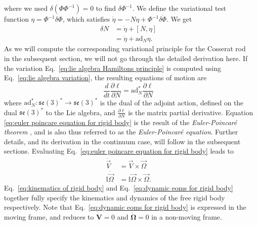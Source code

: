 where we used $\delta (\Phi \Phi^{-1}) = 0$ to find $\delta \Phi^{-1}$. We define the variational test function $\eta = \Phi^{-1} \delta \Phi$, which satisfies $\dot{\eta} = - N \eta + \Phi^{-1} \delta \dot{\Phi}$. We get
\begin{equation} \label{eq:lie algebra variation}
\begin{aligned}
\delta N & = \dot{\eta} + [N, \eta] \\
& = \dot{\eta} + \text{ad}_N \eta.
\end{aligned}
\end{equation}
As we will compute the corresponding variational principle for the Cosserat rod in the subsequent section, we will not go through the detailed derivation here. If the variation Eq.~\ref{eq:lie algebra Hamiltons principle} is computed using Eq.~\ref{eq:lie algebra variation}, the resulting equations of motion are
\begin{equation} \label{eq:euler poincare equation for rigid body}
\frac{d}{dt} \frac{\partial \ell}{\partial N} = \text{ad}_N^* \frac{\partial \ell}{\partial N}
\end{equation}
where $\text{ad}^*_N : \mathfrak{se}(3)^* \to \mathfrak{se}(3)^*$ is the dual of the adjoint action, defined on the dual $\mathfrak{se}(3)^*$ to the Lie algebra, and $\frac{\partial \ell}{\partial N}$ is the matrix partial derivative. Equation \ref{eq:euler poincare equation for rigid body} is the result of the \textit{Euler-Poincaré theorem} \citep{marleHenriPoincareNote2013a, marsdenIntroductionMechanicsSymmetry2013, marleHenriPoincareNote2013a, poincareFormeNouvelleEquations1901}, and is also thus referred to as the \textit{Euler-Poincaré equation}. Further details, and its derivation in the continuum case, will follow in the subsequent sections. Evaluating Eq.~\ref{eq:euler poincare equation for rigid body} leads to
\begin{subequations} \label{eq:dynamic eoms for rigid body}
\begin{align} 
\dot{\vec{V}} & = \vec{V} \times \vec{\Omega} \label{eq:V rigid body equation} \\
\mathbb{I} \dot{\vec{\Omega}} & = \mathbb{I} \vec{\Omega} \times \vec{\Omega}.
\end{align}
\end{subequations}
Eq.~\ref{eq:kinematics of rigid body} and Eq.~\ref{eq:dynamic eoms for rigid body} together fully specify the kinematics and dynamics of the free rigid body respectively. Note that Eq.~\ref{eq:dynamic eoms for rigid body} is expressed in the moving frame, and reduces to $\dot{\mathbf{V}} = 0$ and $\dot{\boldsymbol{\Omega}} = 0$ in a non-moving frame.


